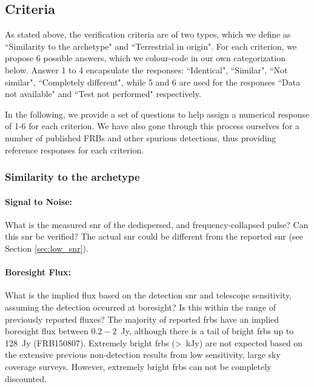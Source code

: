 \documentclass[a4paper,fleqn,usenatbib]{mnras}
\begin{document}
\subsection{Criteria}
\label{sec:criteria}

As stated above, the verification criteria are of two types, which we define as
``Similarity to the archetype" and ``Terrestrial in origin". For each criterion,
we propose 6 possible answers, which we colour-code in our own categorization
below. Answer 1 to 4 encapsulate the responses: ``Identical", ``Similar", ``Not
similar", ``Completely different", while 5 and 6 are used for the responses
``Data not available" and ``Test not performed" respectively.

In the following, we provide a set of questions to help assign a numerical
response of 1-6 for each criterion. We have also gone through this process
ourselves for a number of published FRBs and other spurious detections, thus
providing reference responses for each criterion.  

\subsubsection{Similarity to the archetype}

\paragraph{Signal to Noise:}

What is the measured \gls{snr} of the dedispersed, and frequency-collapsed
pulse? Can this \gls{snr} be verified? The actual \gls{snr} could be different
from the reported \gls{snr} (see Section \ref{sec:low_snr}).

\paragraph{Boresight Flux:}

What is the implied flux based on the detection \gls{snr} and telescope
sensitivity, assuming the detection occurred at boresight? Is this within the
range of previously reported fluxes? The majority of reported \glspl{frb} have
an implied boresight flux between $0.2-2$~Jy, although there is a tail of bright
\glspl{frb} up to 128~Jy (FRB150807). Extremely bright \glspl{frb} (>~kJy) are
not expected based on the extensive previous non-detection results from low
sensitivity, large sky coverage surveys. However, extremely bright \glspl{frb}
can not be completely discounted.
\end{document}
